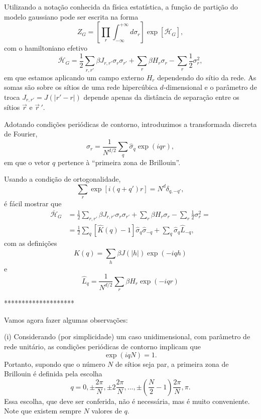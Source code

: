 \documentclass[12pt,a4paper]{article}
\newcommand{\Hb}{\overline{\mathcal{H}}}
\newcommand{\sh}{\widehat{\sigma}}
\newcommand{\Kh}{\widehat{K}}
\newcommand{\Lh}{\widehat{L}}
\begin{document}
Utilizando a notação conhecida da física estatística, a função de partição do
modelo gaussiano pode ser escrita na forma
\begin{equation}
Z_G=\left[\prod_r\int_{-\infty}^{+\infty}d\sigma_r\right]\exp\left[\Hb_G\right],
\end{equation}
com o hamiltoniano efetivo
\begin{equation}
\Hb_G=\frac12\sum_{r,r'}\beta J_{r,r'}\sigma_r\sigma_{r'}+\sum_r\beta H_r\sigma_r-\sum_r\frac12\sigma_r^2,
\end{equation}
em que estamos aplicando um campo externo $H_r$ dependendo do sítio da
rede. As somas são sobre os sítios de uma rede hipercúbica $d$-dimensional
e o parâmetro de troca $J_{r,r'}=J\left(|r'-r|\right)$ depende apenas da distância de
separação entre os sítios $\vec r$ e $\vec r\,'$.

Adotando condições periódicas de contorno, introduzimos a transformada
discreta de Fourier,
\begin{equation}
\sigma_r=\frac{1}{N^{d/2}}\sum_q\sh_q\exp\left(iqr\right),
\end{equation}
em que o vetor $q$ pertence à ``primeira zona de Brillouin''.

Usando a condição de ortogonalidade,
\begin{equation}
\sum_r\exp\left[i\left(q+q'\right)r\right]=N^d\delta_{q,-q'},
\end{equation}
é fácil mostrar que
\begin{equation}
\begin{split}
\Hb_G&=\frac12\sum_{r,r'}\beta J_{r,r'}\sigma_r\sigma_{r'}+\sum_r\beta H_r\sigma_r-\sum_r\frac12\sigma_r^2=\\
&=\frac12\sum_q\left[\Kh(q)-1\right]\sh_q\sh_{-q}+\sum_q\sh_q\Lh_{-q},
\end{split}
\end{equation}
com as definições
\begin{equation}
\Kh(q)=\sum_h\beta J\left(|h|\right)\exp\left(-iqh\right)
\end{equation}
e
\begin{equation}
\Lh_q=\frac{1}{N^{d/2}}\sum_r\beta H_r\exp\left(-iqr\right)
\end{equation}

\begin{center}********************\end{center}

Vamos agora fazer algumas observações:

(i) Considerando (por simplicidade) um caso unidimensional, com parâmetro
de rede unitário, as condições periódicas de contorno implicam que
\begin{equation}
\exp\left(iqN\right)=1.
\end{equation}
Portanto, supondo que o número $N$ de sítios seja par, a primeira zona de
Brillouin é definida pela escolha
\begin{equation}
q=0,\pm\frac{2\pi}{N},\pm2\frac{2\pi}{N},...,\pm\left(\frac N2-1\right)\frac{2\pi}{N},\pi.
\end{equation}
Essa escolha, que deve ser conferida, não é necessária, mas é muito
conveniente. Note que existem sempre $N$ valores de $q$.
\end{document}
